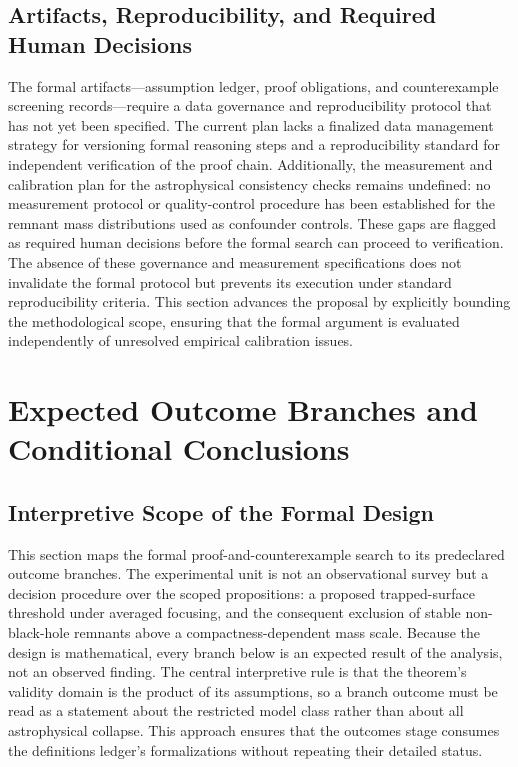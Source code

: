 \documentclass[conference]{IEEEtran}
\begin{document}
\subsection{Artifacts, Reproducibility, and Required Human Decisions}
The formal artifacts—assumption ledger, proof obligations, and counterexample screening records—require a data governance and reproducibility protocol that has not yet been specified. The current plan lacks a finalized data management strategy for versioning formal reasoning steps and a reproducibility standard for independent verification of the proof chain. Additionally, the measurement and calibration plan for the astrophysical consistency checks remains undefined: no measurement protocol or quality-control procedure has been established for the remnant mass distributions used as confounder controls. These gaps are flagged as required human decisions before the formal search can proceed to verification. The absence of these governance and measurement specifications does not invalidate the formal protocol but prevents its execution under standard reproducibility criteria. This section advances the proposal by explicitly bounding the methodological scope, ensuring that the formal argument is evaluated independently of unresolved empirical calibration issues.

\section{Expected Outcome Branches and Conditional Conclusions}
\subsection{Interpretive Scope of the Formal Design}
This section maps the formal proof-and-counterexample search to its predeclared outcome branches. The experimental unit is not an observational survey but a decision procedure over the scoped propositions: a proposed trapped-surface threshold under averaged focusing, and the consequent exclusion of stable non-black-hole remnants above a compactness-dependent mass scale. Because the design is mathematical, every branch below is an expected result of the analysis, not an observed finding. The central interpretive rule is that the theorem's validity domain is the product of its assumptions, so a branch outcome must be read as a statement about the restricted model class rather than about all astrophysical collapse. This approach ensures that the outcomes stage consumes the definitions ledger's formalizations without repeating their detailed status.
\end{document}
